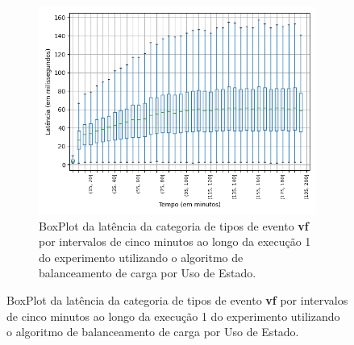 

\begin{figure}
\centering
\begin{subfigure}{.5\textwidth}
\centering
\includegraphics[width=\textwidth]{figuras/graphics/boxplot_5-dez-su_vf.png}
\caption{BoxPlot da latência da categoria de tipos de evento \textbf{vf} por intervalos de cinco minutos ao longo da execução 1 do experimento utilizando o algoritmo de balanceamento de carga por Uso de Estado.}
\label{fig:BoxPlot_vf_SU_1}
\end{subfigure}%


\end{figure}
